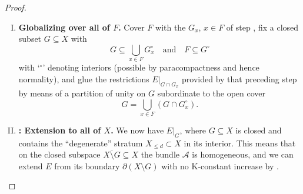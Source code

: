\documentclass[11pt,leqno]{article}
\theoremstyle{plain}
\theoremstyle{plain}
\theoremstyle{plain}
\numberwithin{equation}{section}
\theoremstyle{nonumberplain}
\newtheorem{proof}{Proof}
\newcommand\cA{{\mathcal A}}
\newcommand\1{{\bf 1}}
\begin{document}
\begin{proof}
\begin{enumerate}[(I),wide]
  \item\label{item:frwrd.glob} {\bf Globalizing  over all of $F$.} Cover $F$ with the $G_{x}$, $x\in F$ of step , fix a closed subset $G\subseteq X$ with 
    \begin{equation*}
      G\subseteq \bigcup_{x\in F}G_x^{\circ}      
      \quad\text{and}\quad
      F\subseteq G^{\circ}
    \end{equation*}
    with `$^\circ$' denoting interiors (possible by paracompactness and hence \cite[Theorem 20.10]{wil_top} normality), and glue the restrictions $E|_{G\cap G_x}$ provided by that preceding step by means of a partition of unity on $G$ subordinate to the open cover
    \begin{equation*}
      G=\bigcup_{x\in F}\left(G\cap G^{\circ}_x\right).
    \end{equation*}
    
  \item\label{item:all} {\bf : Extension to all of $X$.} We now have $E|_G$, where $G\subseteq X$ is closed and contains the ``degenerate'' stratum $X_{\le d}\subset X$ in its interior. This means that on the closed subspace $\overline{X\setminus G}\subseteq X$ the bundle $\cA$ is homogeneous, and we can extend $E$ from its boundary $\partial(X\setminus G)$ with no K-constant increase by .
  \end{enumerate}  
\end{proof}
\end{document}
